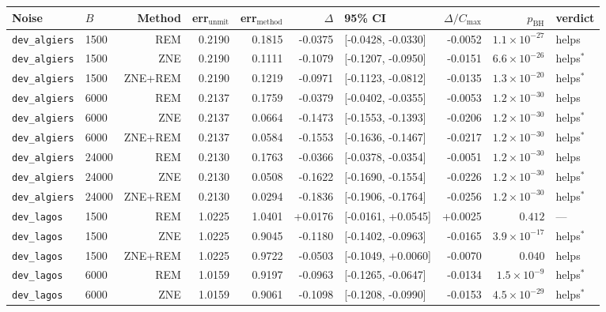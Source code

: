 \begin{tabular}{@{}llrrrrlrrl@{}}
\toprule
Noise & $B$ & Method & err$_{\text{unmit}}$ & err$_{\text{method}}$ & $\Delta$ & 95\% CI & $\Delta/C_{\max}$ & $p_{\mathrm{BH}}$ & verdict \\
\midrule
\texttt{dev\_algiers} & 1500 & REM & 0.2190 & 0.1815 & -0.0375 & [-0.0428, -0.0330] & -0.0052 & $1.1\times10^{-27}$ & helps \\
\texttt{dev\_algiers} & 1500 & ZNE & 0.2190 & 0.1111 & -0.1079 & [-0.1207, -0.0950] & -0.0151 & $6.6\times10^{-26}$ & helps$^{\ast}$ \\
\texttt{dev\_algiers} & 1500 & ZNE+REM & 0.2190 & 0.1219 & -0.0971 & [-0.1123, -0.0812] & -0.0135 & $1.3\times10^{-20}$ & helps$^{\ast}$ \\
\texttt{dev\_algiers} & 6000 & REM & 0.2137 & 0.1759 & -0.0379 & [-0.0402, -0.0355] & -0.0053 & $1.2\times10^{-30}$ & helps \\
\texttt{dev\_algiers} & 6000 & ZNE & 0.2137 & 0.0664 & -0.1473 & [-0.1553, -0.1393] & -0.0206 & $1.2\times10^{-30}$ & helps$^{\ast}$ \\
\texttt{dev\_algiers} & 6000 & ZNE+REM & 0.2137 & 0.0584 & -0.1553 & [-0.1636, -0.1467] & -0.0217 & $1.2\times10^{-30}$ & helps$^{\ast}$ \\
\texttt{dev\_algiers} & 24000 & REM & 0.2130 & 0.1763 & -0.0366 & [-0.0378, -0.0354] & -0.0051 & $1.2\times10^{-30}$ & helps \\
\texttt{dev\_algiers} & 24000 & ZNE & 0.2130 & 0.0508 & -0.1622 & [-0.1690, -0.1554] & -0.0226 & $1.2\times10^{-30}$ & helps$^{\ast}$ \\
\texttt{dev\_algiers} & 24000 & ZNE+REM & 0.2130 & 0.0294 & -0.1836 & [-0.1906, -0.1764] & -0.0256 & $1.2\times10^{-30}$ & helps$^{\ast}$ \\
\texttt{dev\_lagos} & 1500 & REM & 1.0225 & 1.0401 & +0.0176 & [-0.0161, +0.0545] & +0.0025 & $0.412$ & --- \\
\texttt{dev\_lagos} & 1500 & ZNE & 1.0225 & 0.9045 & -0.1180 & [-0.1402, -0.0963] & -0.0165 & $3.9\times10^{-17}$ & helps$^{\ast}$ \\
\texttt{dev\_lagos} & 1500 & ZNE+REM & 1.0225 & 0.9722 & -0.0503 & [-0.1049, +0.0060] & -0.0070 & $0.040$ & helps \\
\texttt{dev\_lagos} & 6000 & REM & 1.0159 & 0.9197 & -0.0963 & [-0.1265, -0.0647] & -0.0134 & $1.5\times10^{-9}$ & helps$^{\ast}$ \\
\texttt{dev\_lagos} & 6000 & ZNE & 1.0159 & 0.9061 & -0.1098 & [-0.1208, -0.0990] & -0.0153 & $4.5\times10^{-29}$ & helps$^{\ast}$ \\

\end{tabular}
